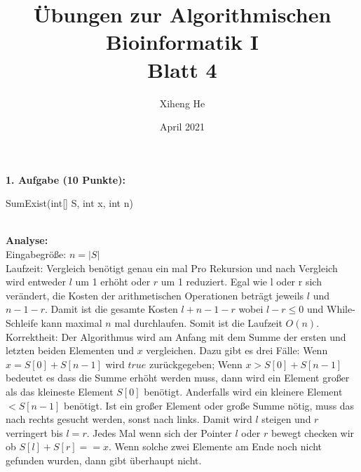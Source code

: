 \documentclass{article}
\title{Übungen zur Algorithmischen Bioinformatik I\\
Blatt 4}
\author{Xiheng He }
\date{April 2021}
\begin{document}
\maketitle
\begin{flushleft}
\textbf{1. Aufgabe (10 Punkte):}
\renewcommand\footnoterule{}
\begin{algorithm}
    \NoCaptionOfAlgo
    \caption{SumExist(int[] S, int x, int n)}
\end{algorithm}\\
\textbf{Analyse:} \\
Eingabegröße: $n = |S|$ \\
Laufzeit: Vergleich benötigt genau ein mal Pro Rekursion und nach Vergleich wird entweder $l$ um 1 erhöht oder $r$ um 1 reduziert. 
Egal wie l oder r sich verändert, die Kosten der arithmetischen Operationen beträgt jeweils $l$ und $n-1-r$.
Damit ist die gesamte Kosten $l+n-1-r$ wobei $l-r \leq 0$ und While-Schleife kann maximal $n$ mal durchlaufen. 
Somit ist die Laufzeit $O(n)$.
\newline
Korrektheit: Der Algorithmus wird am Anfang mit dem Summe der ersten und letzten beiden Elementen und $x$ vergleichen.
Dazu gibt es drei Fälle: Wenn $x = S[0] + S[n-1]$ wird $true$ zurückgegeben; Wenn $x > S[0] + S[n-1]$ bedeutet es dass 
die Summe erhöht werden muss, dann wird ein Element großer als das kleineste Element $S[0]$ benötigt. Anderfalls wird ein kleinere Element $<S[n-1]$ benötigt.
Ist ein großer Element oder große Summe nötig, muss das nach rechts gesucht werden, sonst nach links. Damit wird $l$ steigen und $r$ verringert bis $l=r$.
Jedes Mal wenn sich der Pointer $l$ oder $r$ bewegt checken wir ob $S[l] + S[r] == x$.
Wenn solche zwei Elemente am Ende noch nicht gefunden wurden, dann gibt überhaupt nicht. 
\end{flushleft}
\end{document}
